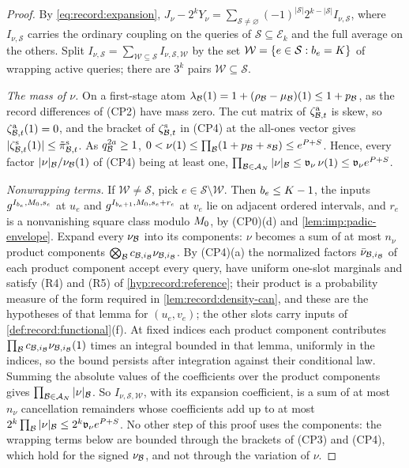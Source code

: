 \begin{proof}
By \eqref{eq:record:expansion},
$J_\nu-2^kY_\nu=\sum_{\mathcal S\ne\varnothing}(-1)^{|\mathcal S|}
2^{k-|\mathcal S|}I_{\nu,\mathcal S}$, where $I_{\nu,\mathcal S}$ carries the
ordinary coupling on the queries of $\mathcal S\subseteq\mathcal E_k$ and the
full average on the others. Split
$I_{\nu,\mathcal S}=\sum_{\mathcal W\subseteq\mathcal S}I_{\nu,\mathcal S,\mathcal W}$
by the set $\mathcal W=\{e\in\mathcal S:b_e=K\}$ of wrapping active
queries; there are $3^k$ pairs $\mathcal W\subseteq\mathcal S$.

\emph{The mass of $\nu$.} On a first-stage atom
$\lambda_\mathcal B(1)=1+(\rho_\mathcal B-\mu_\mathcal B)(1)\le1+p_\mathcal B$, as the record
differences of (CP2) have mass zero. The cut matrix of
$\zeta^{\rm a}_{\mathcal B,t}$ is skew, so $\zeta^{\rm a}_{\mathcal B,t}(1)=0$, and the
bracket of $\zeta^{\rm s}_{\mathcal B,t}$ in (CP4) at the all-ones vector gives
$|\zeta^{\rm s}_{\mathcal B,t}(1)|\le\tilde\pi^{\rm s}_{\mathcal B,t}$. As $q_\mathcal B^{2a}\ge1$,
$0<\nu(1)\le\prod_\mathcal B(1+p_\mathcal B+s_\mathcal B)\le e^{P+S}$. Hence, every factor
$|\nu|_\mathcal B/\nu_\mathcal B(1)$ of (CP4) being at least one,
$\prod_{\mathcal B\in\mathcal A_N}|\nu|_\mathcal B\le\mathfrak v_\nu\,\nu(1)\le
\mathfrak v_\nu e^{P+S}$.

\emph{Nonwrapping terms.} If $\mathcal W\ne\mathcal S$, pick
$e\in\mathcal S\setminus\mathcal W$. Then $b_e\le K-1$, the inputs
$g^{I_{b_e},M_0,s_e}$ at $u_e$ and $g^{I_{b_e+1},M_0,s_e+r_e}$ at $v_e$
lie on adjacent ordered intervals, and $r_e$ is a nonvanishing square
class modulo $M_0$, by (CP0)(d) and \cref{lem:imp:padic-envelope}. Expand every
$\nu_\mathcal B$ into its components: $\nu$ becomes a sum of at most $n_\nu$
product components $\bigotimes_\mathcal B c_{\mathcal B,i_\mathcal B}\nu_{\mathcal B,i_\mathcal B}$. By
(CP4)(a) the normalized factors $\bar\nu_{\mathcal B,i_\mathcal B}$ of each product
component accept every query, have uniform one-slot marginals and satisfy
(R4) and (R5) of \cref{hyp:record:reference}; their product is a probability
measure of the form required in \cref{lem:record:density-can}, and these are
the hypotheses of that lemma for $(u_e,v_e)$; the other slots carry inputs of
\cref{def:record:functional}(f). At fixed indices each product component
contributes $\prod_\mathcal B c_{\mathcal B,i_\mathcal B}\nu_{\mathcal B,i_\mathcal B}(1)$ times an integral
bounded in that lemma, uniformly in the indices, so the bound persists after
integration against their conditional law. Summing the absolute values of the
coefficients over the product components gives
$\prod_{\mathcal B\in\mathcal A_N}|\nu|_\mathcal B$. So $I_{\nu,\mathcal S,\mathcal W}$,
with its expansion coefficient, is a sum of at most $n_\nu$ cancellation
remainders whose coefficients add up to at most
$2^k\prod_\mathcal B|\nu|_\mathcal B\le2^k\mathfrak v_\nu e^{P+S}$. No other step of this
proof uses the components: the wrapping terms below are bounded through the
brackets of (CP3) and (CP4), which hold for the signed $\nu_\mathcal B$, and not
through the variation of $\nu$.


\end{proof}
